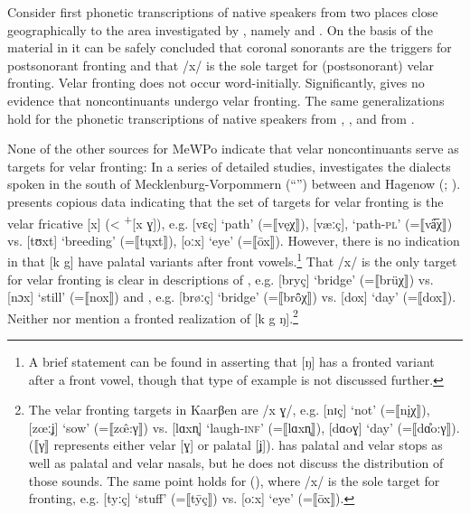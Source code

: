 \begin{sloppypar}
Consider first  phonetic transcriptions of native speakers from two places close geographically to the area investigated by \citet{Kolz1914}, namely  and . On the basis of the material in \citet{Teuchert1927} it can be safely concluded that coronal sonorants are the triggers for postsonorant fronting and that /x/ is the sole target for (postsonorant) velar fronting. Velar fronting does not occur word-initially. Significantly, \citet{Teuchert1927} gives no evidence that noncontinuants undergo velar fronting. The same generalizations hold for the phonetic transcriptions of native speakers from , , and  from \citet{TeuchertSchmitt1933}.\largerpage

None of the other sources for MeWPo indicate that velar noncontinuants serve as targets for velar fronting: In a series of detailed studies, \citet{Jacobs1925a, Jacobs1925b, Jacobs1926} investigates the dialects spoken in the south of Mecklenburg-Vorpommern (“”) between  and Hagenow (; ). \citet{Jacobs1925b} presents copious data indicating that the set of targets for velar fronting is the velar fricative [x] (< \textsuperscript{+}[x ɣ]), e.g. [vɛç] ‘path’ (=⟦vęχ⟧), [væːç], ‘path-\textsc{pl}’ (=⟦vä̅χ⟧) vs. [tʊxt] ‘breeding’ (=⟦tųxt⟧), [oːx] ‘eye’ (=⟦ōx⟧). However, there is no indication in \citet{Jacobs1925a, Jacobs1925b, Jacobs1926} that [k g] have palatal variants after front vowels.\footnote{{A brief statement can be found in \citet[47]{Jacobs1925a} asserting that [ŋ] has a fronted variant after a front vowel, though that type of example is not discussed further.} } That /x/ is the only target for velar fronting is clear in descriptions of  \citep{Holst1907}, e.g. [bryç] ‘bridge’ (=⟦brüχ⟧) vs. [nɔx] ‘still’ (=⟦nox⟧) and  \citep{Warnkross1912}, e.g. [brøːç] ‘bridge’ (=⟦br\^{ö}χ⟧) vs. [dox] ‘day’ (=⟦dox⟧). Neither \citet{Holst1907} nor \citet{Warnkross1912} mention a fronted realization of [k g ŋ].\footnote{{The velar fronting targets in Kaarβen \citep{Dützmann1932} are /x ɣ/, e.g. [nɪç] ‘not’ (=⟦n\k{i}χ⟧), [zœːʝ] ‘sow’ (=⟦z\^{œ}:γ⟧) vs. [lɑxn̥] ‘laugh}\textrm{\textsc{{}-inf}}\textrm{’ (=⟦lɑxn̥⟧), [dɑoɣ] ‘day’ (=⟦dɑ̊o:γ⟧). (⟦γ⟧ represents either velar [ɣ] or palatal [ʝ]). \citet[12]{Dützmann1932} has palatal and velar stops as well as palatal and velar nasals, but he does not discuss the distribution of those sounds. The same point holds for  (\citealt{GSchmidt1912}), where /x/ is the sole target for fronting, e.g. [tyːç] ‘stuff’ (=⟦tȳç⟧) vs. [oːx] ‘eye’ (=⟦ōx⟧).} }
\end{sloppypar}

